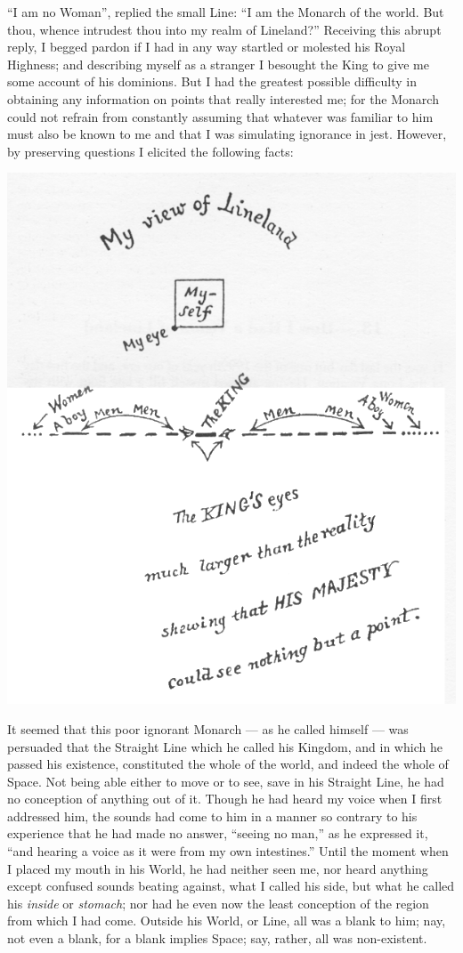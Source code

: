 \documentclass[10pt, kindle, oneside]{kindle}
\begin{document}
``I am no Woman'', replied the small Line: ``I am the Monarch of the world. But
thou, whence intrudest thou into my realm of Lineland?'' Receiving this abrupt
reply, I begged pardon if I had in any way startled or molested his Royal
Highness; and describing myself as a stranger I besought the King to give me
some account of his dominions. But I had the greatest possible difficulty in
obtaining any information on points that really interested me; for the Monarch
could not refrain from constantly assuming that whatever was familiar to him
must also be known to me and that I was simulating ignorance in jest. However,
by preserving questions I elicited the following facts:

\includegraphics[trim=0mm 0mm 0mm 0mm,width=\linewidth]{fig6}

It seemed that this poor ignorant Monarch --- as he called himself --- was
persuaded that the Straight Line which he called his Kingdom, and in which he
passed his existence, constituted the whole of the world, and indeed the whole
of Space. Not being able either to move or to see, save in his Straight Line,
he had no conception of anything out of it. Though he had heard my voice when
I first addressed him, the sounds had come to him in a manner so contrary to
his experience that he had made no answer, ``seeing no man,'' as he expressed
it, ``and hearing a voice as it were from my own intestines.'' Until the moment
when I placed my mouth in his World, he had neither seen me, nor heard
anything except confused sounds beating against, what I called his side, but
what he called his \emph{inside} or \emph{stomach}; nor had he even now the least conception
of the region from which I had come. Outside his World, or Line, all was a
blank to him; nay, not even a blank, for a blank implies Space; say, rather,
all was non-existent.
\end{document}
